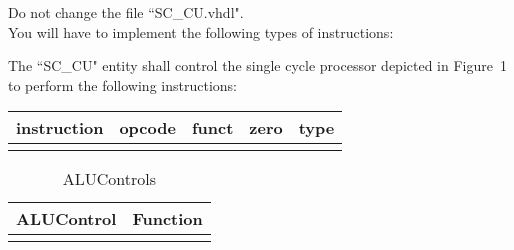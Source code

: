 \documentclass[a4paper,12pt]{article}
\newcommand\Tstrut{\rule{0pt}{2.6ex}}       %
\begin{document}
Do not change the file ``SC\_CU.vhdl".\\


You will have to implement the following types of instructions:

The ``SC\_CU" entity shall control the single cycle processor depicted in Figure~1 to perform the following instructions:

\begin{table}[h!]
\centering
    \begin{tabular}{|c|c|c|c|c|} \hline \Tstrut
		instruction & opcode  & funct	& zero & type   \\ \hline \Tstrut
    \hline
    \end{tabular}
\end{table}


\begin{table}[h!]
\centering
    \begin{tabular}{|c|c|} \hline \Tstrut
		ALUControl & Function   \\ \hline \Tstrut
    \hline
    \end{tabular}
    \caption{ALUControls}
    \label{tab:ALUControls}  
\end{table}
\end{document}
